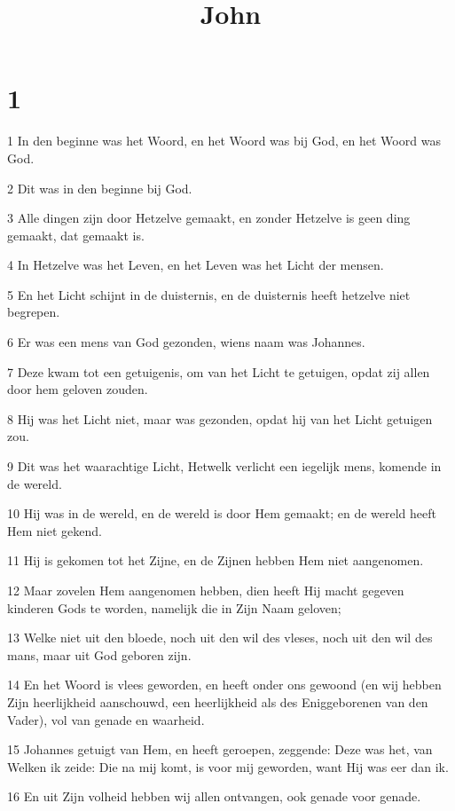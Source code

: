 

\title{John}



\chapter{1}

\par 1 In den beginne was het Woord, en het Woord was bij God, en het Woord was God.
\par 2 Dit was in den beginne bij God.
\par 3 Alle dingen zijn door Hetzelve gemaakt, en zonder Hetzelve is geen ding gemaakt, dat gemaakt is.
\par 4 In Hetzelve was het Leven, en het Leven was het Licht der mensen.
\par 5 En het Licht schijnt in de duisternis, en de duisternis heeft hetzelve niet begrepen.
\par 6 Er was een mens van God gezonden, wiens naam was Johannes.
\par 7 Deze kwam tot een getuigenis, om van het Licht te getuigen, opdat zij allen door hem geloven zouden.
\par 8 Hij was het Licht niet, maar was gezonden, opdat hij van het Licht getuigen zou.
\par 9 Dit was het waarachtige Licht, Hetwelk verlicht een iegelijk mens, komende in de wereld.
\par 10 Hij was in de wereld, en de wereld is door Hem gemaakt; en de wereld heeft Hem niet gekend.
\par 11 Hij is gekomen tot het Zijne, en de Zijnen hebben Hem niet aangenomen.
\par 12 Maar zovelen Hem aangenomen hebben, dien heeft Hij macht gegeven kinderen Gods te worden, namelijk die in Zijn Naam geloven;
\par 13 Welke niet uit den bloede, noch uit den wil des vleses, noch uit den wil des mans, maar uit God geboren zijn.
\par 14 En het Woord is vlees geworden, en heeft onder ons gewoond (en wij hebben Zijn heerlijkheid aanschouwd, een heerlijkheid als des Eniggeborenen van den Vader), vol van genade en waarheid.
\par 15 Johannes getuigt van Hem, en heeft geroepen, zeggende: Deze was het, van Welken ik zeide: Die na mij komt, is voor mij geworden, want Hij was eer dan ik.
\par 16 En uit Zijn volheid hebben wij allen ontvangen, ook genade voor genade.
